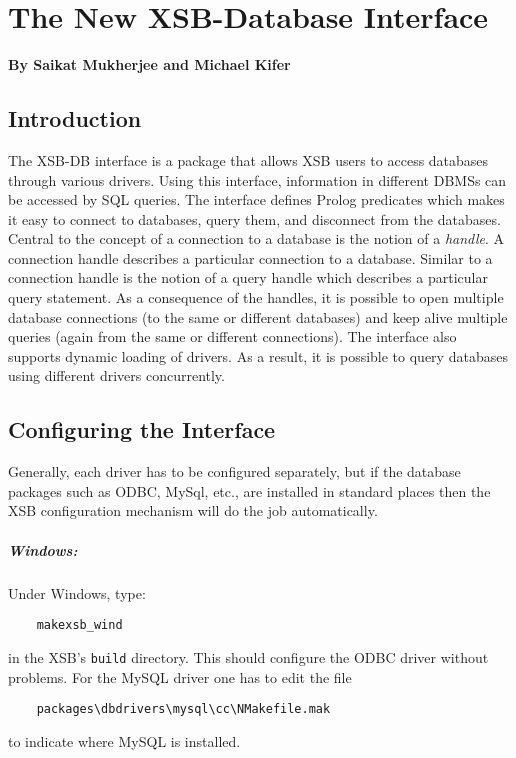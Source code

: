 \chapter{The New XSB-Database Interface} \label{db_interface}

\begin{center}
{\Large {\bf By Saikat Mukherjee and Michael Kifer }}
\end{center}

\section{Introduction}

The XSB-DB interface is a package that allows XSB users to access
databases through various drivers. Using this interface, information
in different DBMSs can be accessed by SQL queries. The interface defines
Prolog predicates which makes it easy to connect to databases, 
query them, and disconnect from the databases. Central to the 
concept of a connection to a database is the notion of a \emph{handle}.
A connection handle describes a particular connection to a database.
Similar to a connection handle is the notion of a query handle which
describes a particular query statement. As a consequence of the handles,
it is possible to open multiple database connections (to the same or
different databases) and keep alive multiple queries (again from the
same or different connections). The interface also supports dynamic loading of
drivers. As a result, it is possible to query databases using different drivers
concurrently.

\section{Configuring the Interface}

Generally, each driver has to be configured separately, but if the database
packages such as ODBC, MySql, etc., are installed in standard places then
the XSB configuration mechanism will do the job automatically.

\paragraph{Windows:}
Under Windows, type:
\begin{verbatim}
    makexsb_wind  
\end{verbatim}
in the XSB's {\tt build} directory. This should configure the ODBC driver
without problems. For the MySQL driver one has to edit the file
\begin{verbatim}
    packages\dbdrivers\mysql\cc\NMakefile.mak  
\end{verbatim}
to indicate where MySQL is installed.

